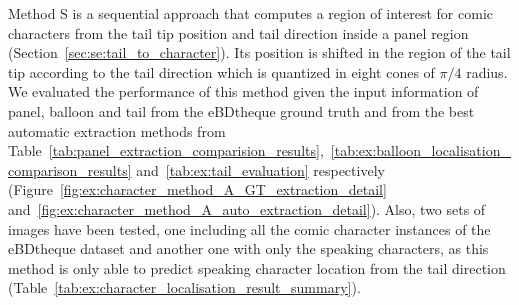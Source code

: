 Method S is a sequential approach that computes a region of interest for comic characters from the tail tip position and tail direction inside a panel region (Section~\ref{sec:se:tail_to_character}).
Its position is shifted in the region of the tail tip according to the tail direction which is quantized in eight cones of $\pi/4$ radius.
We evaluated the performance of this method given the input information of panel, balloon and tail from the eBDtheque ground truth and from the best automatic extraction methods from Table~\ref{tab:panel_extraction_comparision_results},~\ref{tab:ex:balloon_localisation_comparison_results} and~\ref{tab:ex:tail_evaluation} respectively (Figure~\ref{fig:ex:character_method_A_GT_extraction_detail} and~\ref{fig:ex:character_method_A_auto_extraction_detail}).
Also, two sets of images have been tested, one including all the comic character instances of the eBDtheque dataset and another one with only the speaking characters, as this method is only able to predict speaking character location from the tail direction (Table~\ref{tab:ex:character_localisation_result_summary}).

 





